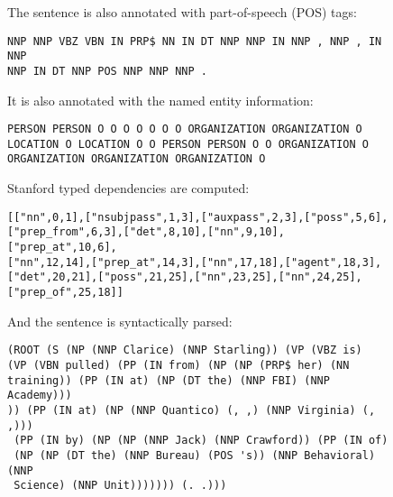 \begin{figure}[h!]
\centering
\begin{minipage}{14.5cm}
The sentence is also annotated with part-of-speech (POS) tags:
\vspace{1.5mm}
\begin{Verbatim}[frame=single]
NNP NNP VBZ VBN IN PRP$ NN IN DT NNP NNP IN NNP , NNP , IN NNP 
NNP IN DT NNP POS NNP NNP NNP .	
\end{Verbatim}
\end{minipage}
\end{figure}

\begin{figure}[h!]
\centering
\begin{minipage}{14.5cm}
It is also annotated with the named entity information:
\vspace{1.5mm}
\begin{Verbatim}[frame=single]
PERSON PERSON O O O O O O O ORGANIZATION ORGANIZATION O 
LOCATION O LOCATION O O PERSON PERSON O O ORGANIZATION O 
ORGANIZATION ORGANIZATION ORGANIZATION O	
\end{Verbatim}
\end{minipage}
\end{figure}

\begin{figure}[h!]
\centering
\begin{minipage}{14.5cm}
Stanford typed dependencies are computed:
\vspace{1.5mm}
\begin{Verbatim}[frame=single]
[["nn",0,1],["nsubjpass",1,3],["auxpass",2,3],["poss",5,6],
["prep_from",6,3],["det",8,10],["nn",9,10],["prep_at",10,6],
["nn",12,14],["prep_at",14,3],["nn",17,18],["agent",18,3],
["det",20,21],["poss",21,25],["nn",23,25],["nn",24,25],
["prep_of",25,18]]	
\end{Verbatim}
\end{minipage}
\end{figure}

\begin{figure}[h!]
\centering
\begin{minipage}{14.5cm}
And the sentence is syntactically parsed:
\vspace{1.5mm}
\begin{Verbatim}[frame=single]
(ROOT (S (NP (NNP Clarice) (NNP Starling)) (VP (VBZ is) 
(VP (VBN pulled) (PP (IN from) (NP (NP (PRP$ her) (NN 
training)) (PP (IN at) (NP (DT the) (NNP FBI) (NNP Academy)))
)) (PP (IN at) (NP (NNP Quantico) (, ,) (NNP Virginia) (, ,)))
 (PP (IN by) (NP (NP (NNP Jack) (NNP Crawford)) (PP (IN of) 
 (NP (NP (DT the) (NNP Bureau) (POS 's)) (NNP Behavioral) (NNP 
 Science) (NNP Unit))))))) (. .)))
\end{Verbatim}
\end{minipage}
\end{figure}

